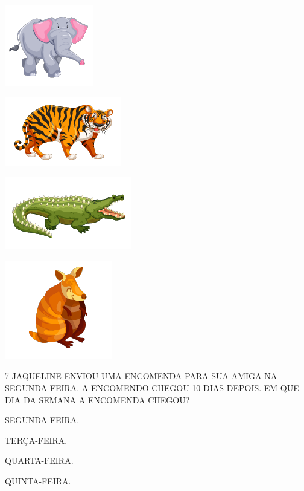 \begin{multicols}{2}
\begin{escolha}
\item \includegraphics[width=.3\textwidth]{./media/SAEB_1ANO_MAT_FIGURA131a.png}
\item \includegraphics[width=.3\textwidth]{./media/SAEB_1ANO_MAT_FIGURA131b.png}

\columnbreak

\item \includegraphics[width=.3\textwidth]{./media/SAEB_1ANO_MAT_FIGURA131c.png}
\item \includegraphics[width=.3\textwidth]{./media/SAEB_1ANO_MAT_FIGURA131d.png}
\end{escolha}
\end{multicols}

\num{7} JAQUELINE ENVIOU UMA ENCOMENDA PARA SUA AMIGA NA SEGUNDA-FEIRA. A ENCOMENDO CHEGOU 10 DIAS DEPOIS. EM QUE DIA
DA SEMANA A ENCOMENDA CHEGOU?

\begin{multicols}{2}
\begin{escolha}[itemsep=0pt]
\item SEGUNDA-FEIRA.

\item TERÇA-FEIRA.

\item QUARTA-FEIRA.

\item QUINTA-FEIRA.
\end{escolha}
\end{multicols}

